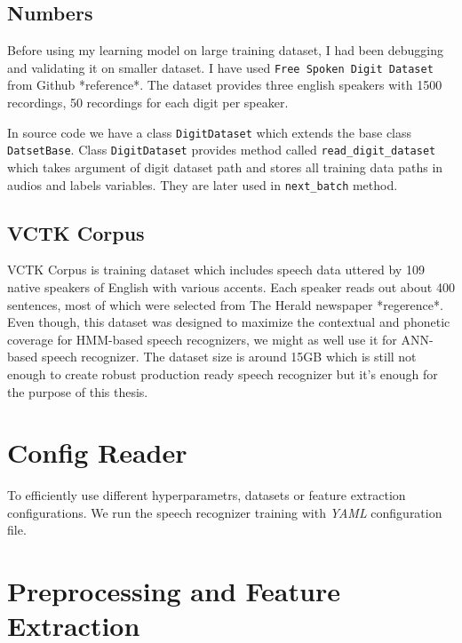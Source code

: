 \subsection{Numbers}

Before using my learning model on large training dataset, I had been debugging and validating it on smaller dataset.
I have used \texttt{Free Spoken Digit Dataset} from Github *reference*.
The dataset provides three english speakers with 1500 recordings, 50 recordings for each digit per speaker.

In source code we have a class \texttt{DigitDataset} which extends the base class \texttt{DatsetBase}.
Class \texttt{DigitDataset} provides method called \texttt{read\_digit\_dataset} which takes argument of digit dataset path and stores all training data paths in audios and labels variables.
They are later used in \texttt{next\_batch} method.

\subsection{VCTK Corpus}

VCTK Corpus is training dataset which includes speech data uttered by 109 native speakers of English with various accents.
Each speaker reads out about 400 sentences, most of which were selected from The Herald newspaper *regerence*.
Even though, this dataset was designed to maximize the contextual and phonetic coverage for HMM-based speech recognizers, we might as well use it for ANN-based speech recognizer.
The dataset size is around 15GB which is still not enough to create robust production ready speech recognizer but it's enough for the purpose of this thesis.

\section{Config Reader}

To efficiently use different hyperparametrs, datasets or feature extraction configurations.
We run the speech recognizer training with \textit{YAML} configuration file.



\section{Preprocessing and Feature Extraction}



